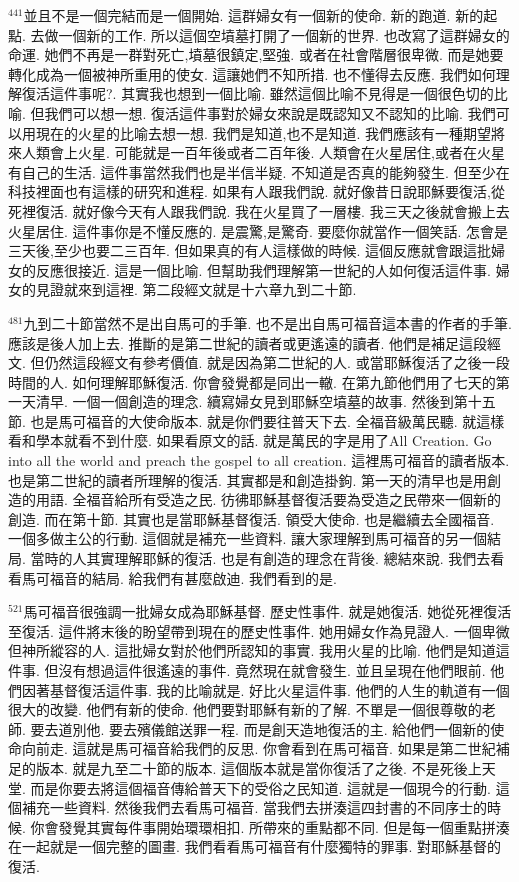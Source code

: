 \documentclass{book}
\begin{document}
$^{441}$並且不是一個完結而是一個開始.
這群婦女有一個新的使命.
新的跑道.
新的起點.
去做一個新的工作.
所以這個空墳墓打開了一個新的世界.
也改寫了這群婦女的命運.
她們不再是一群對死亡,墳墓很鎮定,堅強.
或者在社會階層很卑微.
而是她要轉化成為一個被神所重用的使女.
這讓她們不知所措.
也不懂得去反應.
我們如何理解復活這件事呢?.
其實我也想到一個比喻.
雖然這個比喻不見得是一個很色切的比喻.
但我們可以想一想.
復活這件事對於婦女來說是既認知又不認知的比喻.
我們可以用現在的火星的比喻去想一想.
我們是知道,也不是知道.
我們應該有一種期望將來人類會上火星.
可能就是一百年後或者二百年後.
人類會在火星居住,或者在火星有自己的生活.
這件事當然我們也是半信半疑.
不知道是否真的能夠發生.
但至少在科技裡面也有這樣的研究和進程.
如果有人跟我們說.
就好像昔日說耶穌要復活,從死裡復活.
就好像今天有人跟我們說.
我在火星買了一層樓.
我三天之後就會搬上去火星居住.
這件事你是不懂反應的.
是震驚,是驚奇.
要麼你就當作一個笑話.
怎會是三天後,至少也要二三百年.
但如果真的有人這樣做的時候.
這個反應就會跟這批婦女的反應很接近.
這是一個比喻.
但幫助我們理解第一世紀的人如何復活這件事.
婦女的見證就來到這裡.
第二段經文就是十六章九到二十節.

$^{481}$九到二十節當然不是出自馬可的手筆.
也不是出自馬可福音這本書的作者的手筆.
應該是後人加上去.
推斷的是第二世紀的讀者或更遙遠的讀者.
他們是補足這段經文.
但仍然這段經文有參考價值.
就是因為第二世紀的人.
或當耶穌復活了之後一段時間的人.
如何理解耶穌復活.
你會發覺都是同出一轍.
在第九節他們用了七天的第一天清早.
一個一個創造的理念.
續寫婦女見到耶穌空墳墓的故事.
然後到第十五節.
也是馬可福音的大使命版本.
就是你們要往普天下去.
全福音級萬民聽.
就這樣看和學本就看不到什麼.
如果看原文的話.
就是萬民的字是用了All Creation.
Go into all the world and preach the gospel to all creation.
這裡馬可福音的讀者版本.
也是第二世紀的讀者所理解的復活.
其實都是和創造掛鉤.
第一天的清早也是用創造的用語.
全福音給所有受造之民.
彷彿耶穌基督復活要為受造之民帶來一個新的創造.
而在第十節.
其實也是當耶穌基督復活.
領受大使命.
也是繼續去全國福音.
一個多做主公的行動.
這個就是補充一些資料.
讓大家理解到馬可福音的另一個結局.
當時的人其實理解耶穌的復活.
也是有創造的理念在背後.
總結來說.
我們去看看馬可福音的結局.
給我們有甚麼啟迪.
我們看到的是.

$^{521}$馬可福音很強調一批婦女成為耶穌基督.
歷史性事件.
就是她復活.
她從死裡復活至復活.
這件將末後的盼望帶到現在的歷史性事件.
她用婦女作為見證人.
一個卑微但神所縱容的人.
這批婦女對於他們所認知的事實.
我用火星的比喻.
他們是知道這件事.
但沒有想過這件很遙遠的事件.
竟然現在就會發生.
並且呈現在他們眼前.
他們因著基督復活這件事.
我的比喻就是.
好比火星這件事.
他們的人生的軌道有一個很大的改變.
他們有新的使命.
他們要對耶穌有新的了解.
不單是一個很尊敬的老師.
要去道別他.
要去殯儀館送罪一程.
而是創天造地復活的主.
給他們一個新的使命向前走.
這就是馬可福音給我們的反思.
你會看到在馬可福音.
如果是第二世紀補足的版本.
就是九至二十節的版本.
這個版本就是當你復活了之後.
不是死後上天堂.
而是你要去將這個福音傳給普天下的受俗之民知道.
這就是一個現今的行動.
這個補充一些資料.
然後我們去看馬可福音.
當我們去拼湊這四封書的不同序士的時候.
你會發覺其實每件事開始環環相扣.
所帶來的重點都不同.
但是每一個重點拼湊在一起就是一個完整的圖畫.
我們看看馬可福音有什麼獨特的罪事.
對耶穌基督的復活.
\end{document}
